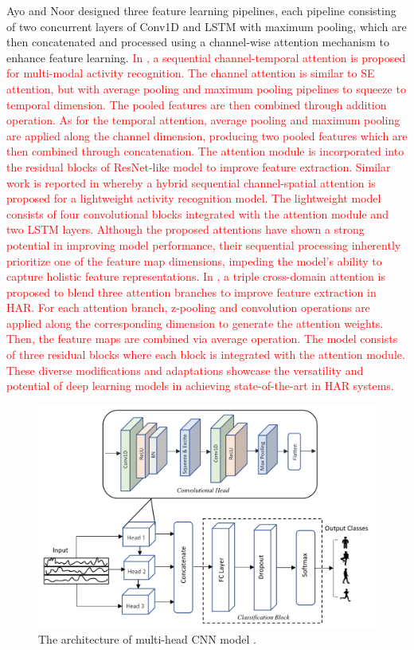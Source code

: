 \documentclass[preprint,12pt]{elsarticle}
\begin{document}
Ayo and Noor \citep{ige_deep_2023} designed three feature learning pipelines, each pipeline consisting of two concurrent layers of Conv1D and LSTM with maximum pooling, which are then concatenated and processed using a channel-wise attention mechanism to enhance feature learning. \textcolor{red}{In \citep{gao_danhar_2021}, a sequential channel-temporal attention is proposed for multi-modal activity recognition. The channel attention is similar to SE attention, but with average pooling and maximum pooling pipelines to squeeze to temporal dimension. The pooled features are then combined through addition operation. As for the temporal attention, average pooling and maximum pooling are applied along the channel dimension, producing two pooled features which are then combined through concatenation. The attention module is incorporated into the residual blocks of ResNet-like model to improve feature extraction. Similar work is reported in \citep{agac_resource-efficient_2024} whereby a hybrid sequential channel-spatial attention is proposed for a lightweight activity recognition model. The lightweight model consists of four convolutional blocks integrated with the attention module and two LSTM layers. Although the proposed attentions have shown a strong potential in improving model performance, their sequential processing inherently prioritize one of the feature map dimensions, impeding the model's ability to capture holistic feature representations. In \citep{tang_triple_2022}, a triple cross-domain attention is proposed to blend three attention branches to improve feature extraction in HAR. For each attention branch, z-pooling \citep{misra_rotate_2020} and convolution operations are applied along the corresponding dimension to generate the attention weights. Then, the feature maps are combined via average operation. The model consists of three residual blocks where each block is integrated with the attention module. These diverse modifications and adaptations showcase the versatility and potential of deep learning models in achieving state-of-the-art in HAR systems.}

\begin{figure}[h!]
    \centering
    \includegraphics[scale=0.5]{fig_har_multi-head_cnn.png}
    \caption{The architecture of multi-head CNN model \citep{khan_attention_2021}.}
    \label{fig_har_multi-head_cnn}
\end{figure}
\end{document}
